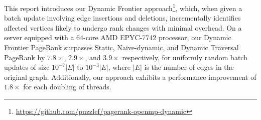 This report introduces our Dynamic Frontier approach\footnote{\url{https://github.com/puzzlef/pagerank-openmp-dynamic}}, which, when given a batch update involving edge insertions and deletions, incrementally identifies affected vertices likely to undergo rank changes with minimal overhead. On a server equipped with a 64-core AMD EPYC-7742 processor, our Dynamic Frontier PageRank surpasses Static, Naive-dynamic, and Dynamic Traversal PageRank by $7.8\times$, $2.9\times$, and $3.9\times$ respectively, for uniformly random batch updates of size $10^{-7}|E|$ to $10^{-3}|E|$, where $|E|$ is the number of edges in the original graph. Additionally, our approach exhibits a performance improvement of $1.8\times$ for each doubling of threads.









